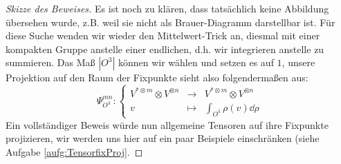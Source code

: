 \begin{proof}[Skizze des Beweises]
Es ist noch zu klären, dass tatsächlich keine Abbildung übersehen wurde, z.B. weil sie nicht als Brauer-Diagramm darstellbar ist.
Für diese Suche wenden wir wieder den Mittelwert-Trick an, diesmal mit einer kompakten Gruppe anstelle einer endlichen, d.h. wir integrieren anstelle zu summieren. Das Maß $|O^3|$ können wir wählen und setzen es auf $1$, unsere Projektion auf den Raum der Fixpunkte sieht also folgendermaßen aus:
\begin{equation}
	\Psi_{O^3}^{mn} : \left\lbrace\begin{array}{rcl}
				V^{\ast \otimes m} \otimes V^{\otimes n} &\to& V^{\ast \otimes m} \otimes V^{\otimes n}
		\\
			v &\mapsto& \int_{O^3} \rho(v) \dd \rho
		\end{array}\right.
\end{equation}
Ein vollständiger Beweis würde nun allgemeine Tensoren auf ihre Fixpunkte projizieren, wir werden uns hier auf ein paar Beispiele einschränken (siehe Aufgabe \ref{aufg:TensorfixProj}.

\end{proof}

